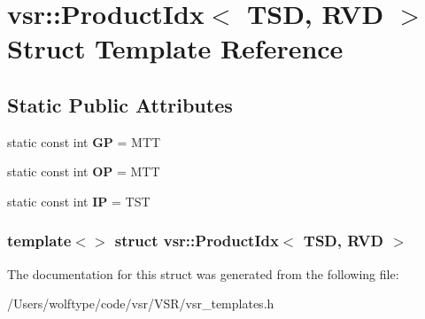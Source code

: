\hypertarget{structvsr_1_1_product_idx_3_01_t_s_d_00_01_r_v_d_01_4}{\section{vsr\-:\-:Product\-Idx$<$ T\-S\-D, R\-V\-D $>$ Struct Template Reference}
\label{structvsr_1_1_product_idx_3_01_t_s_d_00_01_r_v_d_01_4}
}
\subsection*{Static Public Attributes}
\begin{DoxyCompactItemize}
\item 
\hypertarget{structvsr_1_1_product_idx_3_01_t_s_d_00_01_r_v_d_01_4_a336e6a6789a7894d7d91b6e91a1f571b}{static const int {\bfseries G\-P} = M\-T\-T}\label{structvsr_1_1_product_idx_3_01_t_s_d_00_01_r_v_d_01_4_a336e6a6789a7894d7d91b6e91a1f571b}

\item 
\hypertarget{structvsr_1_1_product_idx_3_01_t_s_d_00_01_r_v_d_01_4_a988d24b600b1b32a32830c4a05acbf94}{static const int {\bfseries O\-P} = M\-T\-T}\label{structvsr_1_1_product_idx_3_01_t_s_d_00_01_r_v_d_01_4_a988d24b600b1b32a32830c4a05acbf94}

\item 
\hypertarget{structvsr_1_1_product_idx_3_01_t_s_d_00_01_r_v_d_01_4_a098d15a02c6ed6a1d6c31ba460787a86}{static const int {\bfseries I\-P} = T\-S\-T}\label{structvsr_1_1_product_idx_3_01_t_s_d_00_01_r_v_d_01_4_a098d15a02c6ed6a1d6c31ba460787a86}

\end{DoxyCompactItemize}
\subsubsection*{template$<$$>$ struct vsr\-::\-Product\-Idx$<$ T\-S\-D, R\-V\-D $>$}



The documentation for this struct was generated from the following file\-:\begin{DoxyCompactItemize}
\item 
/\-Users/wolftype/code/vsr/\-V\-S\-R/vsr\-\_\-templates.\-h\end{DoxyCompactItemize}
